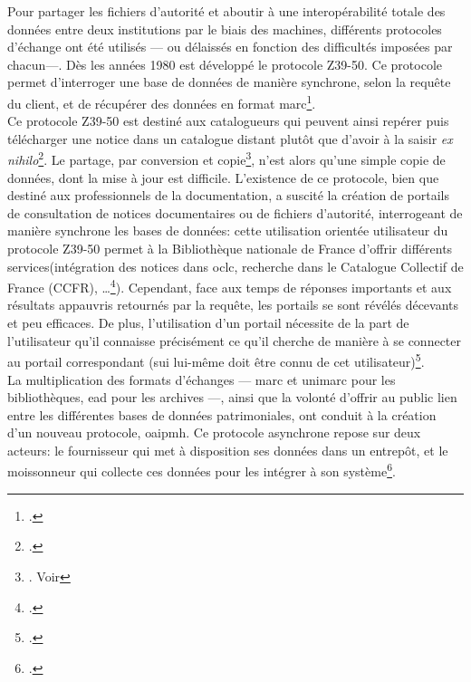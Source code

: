 Pour partager les fichiers d'autorité et aboutir à une interopérabilité totale des données entre deux institutions par le biais des machines, différents protocoles d'échange ont été utilisés --- ou délaissés en fonction des difficultés imposées par chacun---. Dès les années 1980 est développé le protocole Z39-50. Ce protocole permet d'interroger une base de données de manière synchrone, selon la requête du client, et de récupérer des données en format \ac{marc}\footcite{bibliotheque_nationale_de_france_protocole_nodate}.\\

Ce protocole Z39-50 est destiné aux catalogueurs qui peuvent ainsi \og repérer puis télécharger une notice dans un catalogue distant plutôt que d’avoir à la saisir \textit{ex nihilo}\fg{}\footcite{bermes_2_2013}. Le partage, \og par conversion et copie\fg{}\footnote{\cite{bermes_2_2013}. Voir }, n'est alors qu'une simple copie de données, dont la mise à jour est difficile. L'existence de ce protocole, bien que destiné aux professionnels de la documentation, a suscité la création de portails de consultation de notices documentaires ou de fichiers d'autorité, interrogeant de manière synchrone les bases de données: cette utilisation orientée utilisateur du protocole Z39-50 permet à la Bibliothèque nationale de France d'offrir différents services(intégration des notices dans \ac{oclc}, recherche dans le Catalogue Collectif de France (CCFR), \dots\footcite{bibliotheque_nationale_de_france_protocole_nodate}). Cependant, face aux temps de réponses importants et aux résultats appauvris retournés par la requête, les portails se sont révélés décevants et peu efficaces. De plus, l'utilisation d'un portail nécessite de la part de l'utilisateur qu'il connaisse précisément ce qu'il cherche de manière à se connecter au portail correspondant (sui lui-même doit être connu de cet utilisateur)\footcite{dalbin_approches_2011}.\\

La multiplication des formats d'échanges --- \ac{marc} et \ac{unimarc} pour les bibliothèques, \ac{ead} pour les archives ---, ainsi que la volonté d'offrir au public lien entre les différentes bases de données patrimoniales, ont conduit à la création d'un nouveau protocole, \ac{oaipmh}. Ce protocole asynchrone repose sur deux acteurs: le fournisseur qui met à disposition ses données dans un \og entrepôt\fg{}, et le moissonneur qui collecte ces données pour les intégrer à son système\footcite{bibliotheque_nationale_de_france_protocole_nodate-1}.\\

